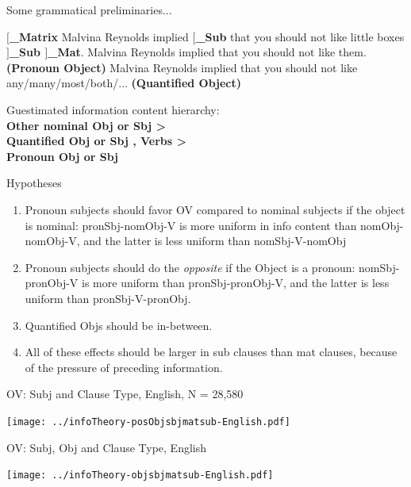 \documentclass[hyperref={pdfpagelabels=false}]{beamer}
\begin{document}
\begin{frame}{Some grammatical preliminaries...}
\begin{exe}
	\ex \textbf{$[$_{Matrix}} Malvina Reynolds implied \textbf{$[$_{Sub}} that you should not like little boxes \textbf{$]$_{Sub} $]$_{Mat}}.
	\ex Malvina Reynolds implied that you should not like them. \textbf{(Pronoun Object)}
	\ex Malvina Reynolds implied that you should not like any/many/most/both/... \textbf{(Quantified Object)}
\end{exe}
\begin{center}
	Guestimated information content hierarchy:\\
	\textbf{Other nominal Obj or Sbj > \\Quantified Obj or Sbj , Verbs > \\Pronoun Obj or Sbj} 
\end{center}
\end{frame}

\begin{frame}{Hypotheses}
\begin{enumerate}
	\item Pronoun subjects should favor OV compared to nominal subjects if the object is nominal: pronSbj-nomObj-V is more uniform in info content than nomObj-nomObj-V, and the latter is less uniform than nomSbj-V-nomObj
	\item Pronoun subjects should do the \textsl{opposite} if the Object is a pronoun: nomSbj-pronObj-V is more uniform than pronSbj-pronObj-V, and the latter is less uniform than pronSbj-V-pronObj.
	\item Quantified Objs should be in-between.
	\item All of these effects should be larger in sub clauses than mat clauses, because of the pressure of preceding information.
\end{enumerate}
\end{frame}


\begin{frame}{OV: Subj and Clause Type, English, N = 28,580} 
\nocite{ycoe,ppcme24 ,ppceme,ppcmbe2}

\texttt{[image: ../infoTheory-posObjsbjmatsub-English.pdf]}

\end{frame}



\begin{frame}{OV: Subj, Obj and Clause Type, English} 



\texttt{[image: ../infoTheory-objsbjmatsub-English.pdf]}

\end{frame}
\end{document}
